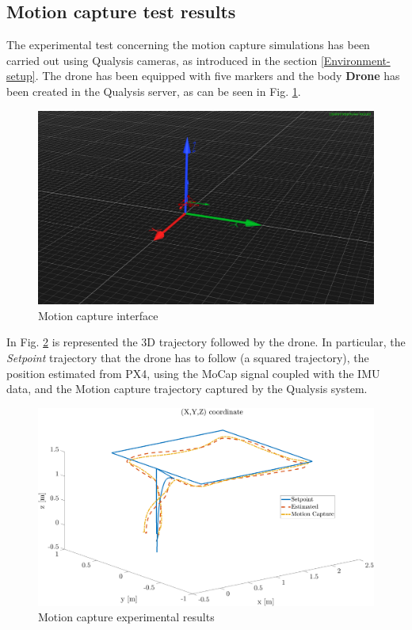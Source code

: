 \documentclass[journal]{IEEEtran}
\begin{document}
\subsection{Motion capture test results}

The experimental test concerning the motion capture simulations has been carried out using Qualysis cameras, as introduced in the section \ref{Environment-setup}. The drone has been equipped with five markers and the body \textbf{Drone} has been created in the Qualysis server, as can be seen in Fig. \ref{fig:mocap_interface}.

\begin{figure}
    \centering
    \includegraphics[scale=0.15]{Images/mocap_interface.png}
    \caption{Motion capture interface}
    \label{fig:mocap_interface}
\end{figure}

In Fig. \ref{fig:mocap_test} is represented the 3D trajectory followed by the drone. In particular, the \textit{Setpoint} trajectory that the drone has to follow (a squared trajectory), the position estimated from PX4, using the MoCap signal coupled with the IMU data, and the Motion capture trajectory captured by the Qualysis system.

\begin{figure}
    \centering
    \includegraphics[scale=0.22]{Images/square_trj/xyz_square1.png}
    \caption{Motion capture experimental results}
    \label{fig:mocap_test}
\end{figure}
\end{document}
